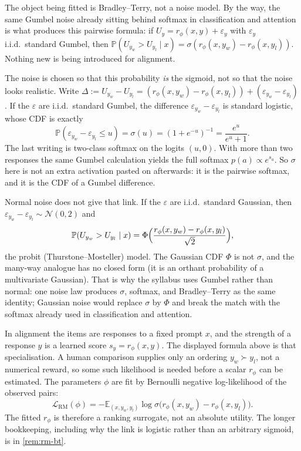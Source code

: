 \documentclass[11pt,a4paper]{article}
\theoremstyle{definition}
\begin{document}
\begin{remark}
The object being fitted is Bradley--Terry, not a noise model. By the way, the same Gumbel noise already sitting behind softmax in classification and attention is what produces this pairwise formula: if \(U_y=r_\phi(x,y)+\varepsilon_y\) with \(\varepsilon_y\) i.i.d.\ standard Gumbel, then \(\mathbb{P}(U_{y_w}>U_{y_l}\mid x)=\sigma(r_\phi(x,y_w)-r_\phi(x,y_l))\). Nothing new is being introduced for alignment.

The noise is chosen so that this probability \emph{is} the sigmoid, not so that the noise looks realistic. Write \(\Delta:=U_{y_w}-U_{y_l}=(r_\phi(x,y_w)-r_\phi(x,y_l))+(\varepsilon_{y_w}-\varepsilon_{y_l})\). If the \(\varepsilon\) are i.i.d.\ standard Gumbel, the difference \(\varepsilon_{y_w}-\varepsilon_{y_l}\) is standard logistic, whose CDF is exactly
\[
\mathbb{P}(\varepsilon_{y_w}-\varepsilon_{y_l}\leq u)
=\sigma(u)
=(1+e^{-u})^{-1}
=\frac{e^{u}}{e^{u}+1}.
\]
The last writing is two-class softmax on the logits \((u,0)\). With more than two responses the same Gumbel calculation yields the full softmax \(p(a)\propto e^{s_a}\). So \(\sigma\) here is not an extra activation pasted on afterwards: it is the pairwise softmax, and it is the CDF of a Gumbel difference.

Normal noise does not give that link. If the \(\varepsilon\) are i.i.d.\ standard Gaussian, then \(\varepsilon_{y_w}-\varepsilon_{y_l}\sim\mathcal{N}(0,2)\) and
\[
\mathbb{P}(U_{y_w}>U_{y_l}\mid x)
=\Phi\Bigl(\frac{r_\phi(x,y_w)-r_\phi(x,y_l)}{\sqrt{2}}\Bigr),
\]
the probit (Thurstone--Mosteller) model. The Gaussian CDF \(\Phi\) is not \(\sigma\), and the many-way analogue has no closed form (it is an orthant probability of a multivariate Gaussian). That is why the syllabus uses Gumbel rather than normal: one noise law produces \(\sigma\), softmax, and Bradley--Terry as the same identity; Gaussian noise would replace \(\sigma\) by \(\Phi\) and break the match with the softmax already used in classification and attention.
\end{remark}

In alignment the items are responses to a fixed prompt \(x\), and the strength of a response \(y\) is a learned score \(s_y=r_\phi(x,y)\). The displayed formula above is that specialisation. A human comparison supplies only an ordering \(y_w\succ y_l\), not a numerical reward, so some such likelihood is needed before a scalar \(r_\phi\) can be estimated. The parameters \(\phi\) are fit by Bernoulli negative log-likelihood of the observed pairs:
\[
\mathcal{L}_{\mathrm{RM}}(\phi)
=-\mathbb{E}_{(x,y_w,y_l)}
\log\sigma\bigl(r_\phi(x,y_w)-r_\phi(x,y_l)\bigr).
\]
The fitted \(r_\phi\) is therefore a ranking surrogate, not an absolute utility. The longer bookkeeping, including why the link is logistic rather than an arbitrary sigmoid, is in \cref{rem:rm-bt}.
\end{document}
